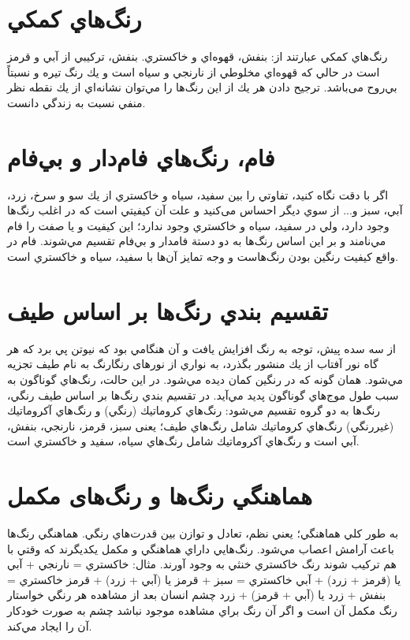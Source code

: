 \documentclass[12pt]{report}
\begin{document}
\section{رنگ‌هاي كمكي }
رنگ‌هاي كمكي عبارتند از: بنفش، قهوه‌اي و خاكستري. بنفش، تركيبي از آبي و قرمز است در حالي كه قهوه‌اي مخلوطي از نارنجي و سياه است و يك رنگ تيره و نسبتاً بي‌روح می‌باشد. ترجيح دادن هر يك از اين رنگ‌ها را مي‌توان نشانه‌اي از يك نقطه نظر منفي نسبت به زندگي دانست.

\section{فام، رنگ‌هاي فام‌دار و بي‌فام}
اگر با دقت نگاه كنيد، تفاوتي را بين سفيد، سياه و خاكستري از يك سو و سرخ، زرد، آبي، سبز و... از سوي ديگر احساس می‌کنید و علت آن كيفيتي است كه در اغلب رنگ‌ها وجود دارد، ولي در سفيد، سياه و خاكستري وجود ندارد؛ اين كيفيت و يا صفت را فام مي‌نامند و بر اين اساس رنگ‌ها به دو دستة فامدار و بي‌فام تقسيم مي‌شوند. فام در واقع كيفيت رنگين بودن رنگ‌هاست و وجه تمايز آن‌ها با سفيد، سياه و خاكستري است.

\section{تقسيم بندي رنگ‌ها بر اساس طيف}
از سه سده پيش، توجه به رنگ افزایش یافت و آن هنگامي بود كه نيوتن پي برد كه هر گاه نور آفتاب از يك منشور بگذرد، به نواري از نورهای رنگارنگ به نام طيف تجزيه مي‌شود. همان گونه كه در رنگين كمان ديده مي‌شود. در اين حالت، رنگ‌هاي گوناگون به سبب طول موج‌هاي گوناگون پديد مي‌آيد.
در تقسيم بندي رنگ‌ها بر اساس طيف رنگي، رنگ‌ها به دو گروه تقسيم مي‌شود: رنگ‌هاي كروماتيك (رنگي) و رنگ‌هاي آكروماتيك (غيررنگي) رنگ‌هاي كروماتيك شامل رنگ‌هاي طيف؛ یعنی سبز، قرمز، نارنجي، بنفش، آبي است و رنگ‌هاي آكروماتيك شامل رنگ‌هاي سياه، سفيد و خاكستري است.

\section{هماهنگي رنگ‌ها و رنگ‌های مکمل }
به طور كلي هماهنگي؛ يعني نظم، تعادل و توازن بين قدرت‌هاي رنگي. هماهنگي رنگ‌ها باعث آرامش اعصاب مي‌شود. رنگ‌هايي داراي هماهنگي و مکمل یکدیگرند كه وقتي با هم تركيب شوند رنگ خاكستري خنثي به وجود آورند. مثال:
\newline
خاكستري = نارنجي + آبي یا (قرمز + زرد) + آبي
خاكستري = سبز + قرمز یا (آبي + زرد) + قرمز
خاكستري = بنفش + زرد یا (آبي + قرمز) + زرد
چشم انسان بعد از مشاهده هر رنگي خواستار رنگ مكمل آن است و اگر آن رنگ براي مشاهده موجود نباشد چشم به صورت خودكار آن را ايجاد مي‌كند.
\end{document}

